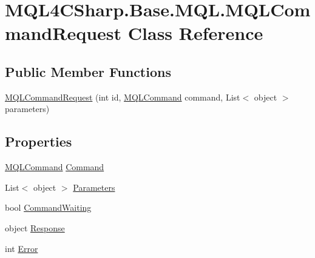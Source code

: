\hypertarget{class_m_q_l4_c_sharp_1_1_base_1_1_m_q_l_1_1_m_q_l_command_request}{}\section{M\+Q\+L4\+C\+Sharp.\+Base.\+M\+Q\+L.\+M\+Q\+L\+Command\+Request Class Reference}
\label{class_m_q_l4_c_sharp_1_1_base_1_1_m_q_l_1_1_m_q_l_command_request}
\subsection*{Public Member Functions}
\begin{DoxyCompactItemize}
\item 
\hyperlink{class_m_q_l4_c_sharp_1_1_base_1_1_m_q_l_1_1_m_q_l_command_request_ad2273c262a8ad39b555fd82668fe4386}{M\+Q\+L\+Command\+Request} (int id, \hyperlink{namespace_m_q_l4_c_sharp_1_1_base_1_1_enums_a86fc232b6f9a036bf9bff2c97fa38439}{M\+Q\+L\+Command} command, List$<$ object $>$ parameters)
\end{DoxyCompactItemize}
\subsection*{Properties}
\begin{DoxyCompactItemize}
\item 
\hyperlink{namespace_m_q_l4_c_sharp_1_1_base_1_1_enums_a86fc232b6f9a036bf9bff2c97fa38439}{M\+Q\+L\+Command} \hyperlink{class_m_q_l4_c_sharp_1_1_base_1_1_m_q_l_1_1_m_q_l_command_request_ae43f427bec18e3127ad6804aef7894df}{Command}
\item 
List$<$ object $>$ \hyperlink{class_m_q_l4_c_sharp_1_1_base_1_1_m_q_l_1_1_m_q_l_command_request_a87d09a533db47f8113c69db21c519ab8}{Parameters}
\item 
bool \hyperlink{class_m_q_l4_c_sharp_1_1_base_1_1_m_q_l_1_1_m_q_l_command_request_ad24a266d216a12137207b7eceff3337e}{Command\+Waiting}
\item 
object \hyperlink{class_m_q_l4_c_sharp_1_1_base_1_1_m_q_l_1_1_m_q_l_command_request_ae3f556839c2657587b3f63b65cae2477}{Response}
\item 
int \hyperlink{class_m_q_l4_c_sharp_1_1_base_1_1_m_q_l_1_1_m_q_l_command_request_a1e94dc9238d00317ae87ec2ab70cdfbd}{Error}
\end{DoxyCompactItemize}


